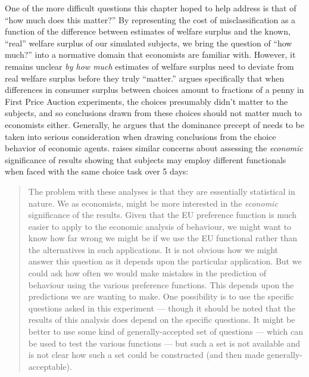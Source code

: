 \documentclass[../main.tex]{subfiles}
\begin{document}
One of the more difficult questions this chapter hoped to help address is that of \enquote{how much does this matter?}
By representing the cost of misclassification as a function of the difference between estimates of welfare surplus and the known, \enquote{real} welfare surplus of our simulated subjects, we bring the question of \enquote{how much?} into a normative domain that economists are familiar with.
However, it remains unclear \textit{by how much} estimates of welfare surplus need to deviate from real welfare surplus before they truly \enquote{matter.}
\textcite{Harrison1989, Harrison1992} argues specifically that when differences in consumer surplus between choices amount to fractions of a penny in First Price Auction experiments, the choices presumably didn't matter to the subjects, and so conclusions drawn from these choices should not matter much to economists either.
Generally, he argues that the dominance precept of \textcite{Smith1982} needs to be taken into serious consideration when drawing conclusions from the choice behavior of economic agents.
\textcite[21]{Hey2001} raises similar concerns about assessing the \textit{economic} significance of results showing that subjects may employ different functionals when faced with the same choice task over 5 days:

\singlespacing
\blockquote{
	The problem with these analyses is that they are essentially statistical in nature.
	We as economists, might be more interested in the \textit{economic} significance of the results. 
	Given that the EU preference function is much easier to apply to the economic analysis of behaviour, we might want to know how far wrong we might be if we use the EU functional rather than the alternatives in such applications.
	It is not obvious how we might answer this question as it depends upon the particular application.
	But we could ask how often we would make mistakes in the prediction of behaviour using the various preference functions.
	This depends upon the predictions we are wanting to make.
	One possibility is to use the specific questions asked in this experiment --- though it should be noted that the results of this analysis does depend on the specific questions.
	It might be better to use some kind of generally-accepted set of questions --- which can be used to test the various functions --- but such a set is not available and is not clear how such a set could be constructed (and then made generally-acceptable).
}
\doublespacing
\end{document}
